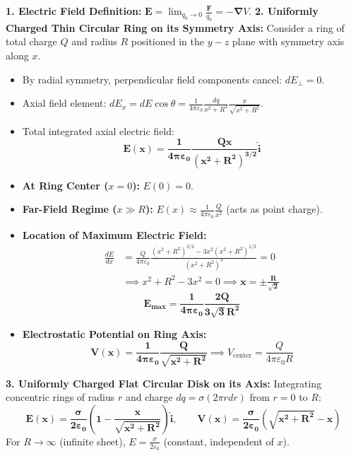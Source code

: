\documentclass[10pt,twoside,openright]{book}
\begin{document}
\begin{formulabox}
\textbf{1. Electric Field Definition:}
$\mathbf{E} = \lim_{q_0 \to 0} \frac{\mathbf{F}}{q_0} = -\boldsymbol{\nabla} V$.
\textbf{2. Uniformly Charged Thin Circular Ring on its Symmetry Axis:}
Consider a ring of total charge $Q$ and radius $R$ positioned in the $y-z$ plane with symmetry axis along $x$.
\begin{itemize}
  \item By radial symmetry, perpendicular field components cancel: $dE_\perp = 0$.
  \item Axial field element: $dE_x = dE \cos\theta = \frac{1}{4\pi\varepsilon_0} \frac{dq}{x^2 + R^2} \frac{x}{\sqrt{x^2 + R^2}}$.
  \item Total integrated axial electric field:
  \begin{equation}
    \mathbf{E(x) = \frac{1}{4\pi\varepsilon_0} \frac{Q x}{(x^2 + R^2)^{3/2}} \hat{\mathbf{i}}}
  \end{equation}
  \item \textbf{At Ring Center ($x=0$):} $E(0) = 0$.
  \item \textbf{Far-Field Regime ($x \gg R$):} $E(x) \approx \frac{1}{4\pi\varepsilon_0}\frac{Q}{x^2}$ (acts as point charge).
  \item \textbf{Location of Maximum Electric Field:}
  \begin{align}
    \frac{dE}{dx} &= \frac{Q}{4\pi\varepsilon_0} \frac{(x^2 + R^2)^{3/2} - 3x^2(x^2 + R^2)^{1/2}}{(x^2 + R^2)^3} = 0 \nonumber \\
    &\implies x^2 + R^2 - 3x^2 = 0 \implies \mathbf{x = \pm \frac{R}{\sqrt{2}}}
  \end{align}
  \begin{equation}
    \mathbf{E_{\max} = \frac{1}{4\pi\varepsilon_0} \frac{2 Q}{3\sqrt{3} R^2}}
  \end{equation}
  \item \textbf{Electrostatic Potential on Ring Axis:}
  \begin{equation}
    \mathbf{V(x) = \frac{1}{4\pi\varepsilon_0} \frac{Q}{\sqrt{x^2 + R^2}}} \implies V_{\text{center}} = \frac{Q}{4\pi\varepsilon_0 R}
  \end{equation}
\end{itemize}
\textbf{3. Uniformly Charged Flat Circular Disk on its Axis:}
Integrating concentric rings of radius $r$ and charge $dq = \sigma (2\pi r dr)$ from $r=0$ to $R$:
\begin{equation}
  \mathbf{E(x) = \frac{\sigma}{2\varepsilon_0} \left(1 - \frac{x}{\sqrt{x^2 + R^2}}\right) \hat{\mathbf{i}}}, \qquad \mathbf{V(x) = \frac{\sigma}{2\varepsilon_0} \left(\sqrt{x^2 + R^2} - x\right)}
\end{equation}
For $R \to \infty$ (infinite sheet), $E = \frac{\sigma}{2\varepsilon_0}$ (constant, independent of $x$).
\end{formulabox}
\end{document}
